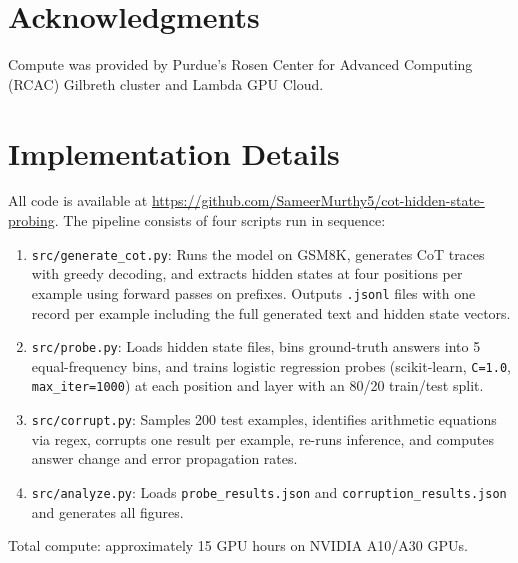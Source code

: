 \documentclass[11pt]{article}
\begin{document}
\section*{Acknowledgments}
Compute was provided by Purdue's Rosen Center for Advanced Computing (RCAC) Gilbreth cluster and Lambda GPU Cloud.



\appendix
\section{Implementation Details}
\label{appendix:impl}

All code is available at \url{https://github.com/SameerMurthy5/cot-hidden-state-probing}. The pipeline consists of four scripts run in sequence:

\begin{enumerate}
    \item \texttt{src/generate\_cot.py}: Runs the model on GSM8K, generates CoT traces with greedy decoding, and extracts hidden states at four positions per example using forward passes on prefixes. Outputs \texttt{.jsonl} files with one record per example including the full generated text and hidden state vectors.
    \item \texttt{src/probe.py}: Loads hidden state files, bins ground-truth answers into 5 equal-frequency bins, and trains logistic regression probes (scikit-learn, \texttt{C=1.0}, \texttt{max\_iter=1000}) at each position and layer with an 80/20 train/test split.
    \item \texttt{src/corrupt.py}: Samples 200 test examples, identifies arithmetic equations via regex, corrupts one result per example, re-runs inference, and computes answer change and error propagation rates.
    \item \texttt{src/analyze.py}: Loads \texttt{probe\_results.json} and \texttt{corruption\_results.json} and generates all figures.
\end{enumerate}

Total compute: approximately 15 GPU hours on NVIDIA A10/A30 GPUs.
\end{document}
